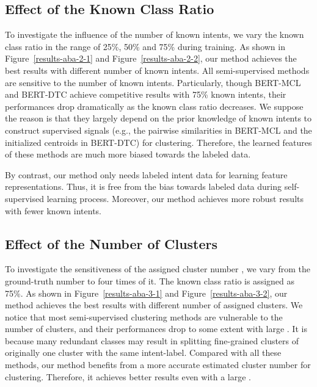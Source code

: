 \documentclass[letterpaper]{article} \usepackage{aaai21}  \usepackage{times}  \usepackage{helvet} \usepackage{courier}  \usepackage[hyphens]{url}  \usepackage{graphicx} \urlstyle{rm} \def\UrlFont{\rm}  \usepackage{natbib}  \usepackage{caption} \frenchspacing  \setlength{\pdfpagewidth}{8.5in}  \setlength{\pdfpageheight}{11in}  \usepackage{amsmath}
\begin{document}
	\subsection{Effect of the Known Class Ratio}
	To investigate the influence of the number of known intents, we vary the known class ratio in the range of 25\%, 50\% and 75\% during training. As shown in Figure~\ref{results-aba-2-1} and Figure~\ref{results-aba-2-2}, our method achieves the best results with different number of known intents. All semi-supervised methods are sensitive to the number of known intents. Particularly, though BERT-MCL and BERT-DTC achieve competitive results with 75\% known intents, their performances drop dramatically as the known class ratio decreases. We suppose the reason is that they largely depend on the prior knowledge of known intents to construct supervised signals (e.g., the pairwise similarities in BERT-MCL and the initialized centroids in BERT-DTC) for clustering. Therefore, the learned features of these methods are much more biased towards the labeled data.
	
	By contrast, our method only needs labeled  intent data for learning feature representations. Thus, it is free from the bias towards labeled data during self-supervised learning process. Moreover, our method achieves more robust results with fewer known intents.
	
	\subsection{Effect of the Number of Clusters}
	To investigate the sensitiveness of the assigned cluster number , we vary  from the ground-truth number to four times of it. The known class ratio is assigned as 75\%. As shown in Figure~\ref{results-aba-3-1} and Figure~\ref{results-aba-3-2}, our method achieves the best results with different number of assigned clusters. We notice that most semi-supervised clustering methods are vulnerable to the number of clusters, and their performances drop to some extent with large  . It is because many redundant classes may result in splitting fine-grained clusters of originally one cluster with the same intent-label. Compared with all these methods, our method benefits from a more accurate estimated cluster number for clustering. Therefore, it achieves better results even with a large  . 

	
	
\end{document}
